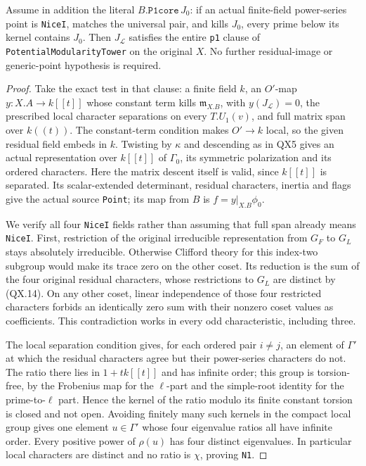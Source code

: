 \begin{proposition}
\label{claim:QX8}
Assume in addition the literal $B.\texttt{P1core}\,J_0$:
if an actual finite-field power-series point is
\texttt{NiceI}, matches the universal pair, and kills
$J_0$, every prime below its kernel contains $J_0$.
Then $J_{\mathcal L}$ satisfies the entire
\texttt{p1} clause of \texttt{PotentialModularityTower}
on the original $X$.  No further residual-image or
generic-point hypothesis is required.
\end{proposition}
\begin{proof}
Take the exact test in that clause: a finite field $k$,
an $O'$-map $y:X.A\to k[[t]]$ whose constant term kills
$\mathfrak m_{X.B}$, with $y(J_{\mathcal L})=0$,
the prescribed local character separations on every
$T.U_1(v)$, and full matrix span over $k((t))$.
The constant-term condition makes $O'\to k$ local,
so the given residual field embeds in $k$.
Twisting by $\kappa$ and descending as in QX5 gives
an actual representation over $k[[t]]$ of $\Gamma_0$,
its symmetric polarization and its ordered characters.
Here the matrix descent itself is valid, since
$k[[t]]$ is separated.  Its scalar-extended determinant,
residual characters, inertia and flags give the actual
source \texttt{Point}; its map from $B$ is
$f=y|_{X.B}\phi_0$.

We verify all four \texttt{NiceI} fields rather than
assuming that full span already means \texttt{NiceI}.
First, restriction of the original irreducible
representation from $G_F$ to $G_L$ stays absolutely
irreducible.  Otherwise Clifford theory for this
index-two subgroup would make its trace zero on the
other coset.  Its reduction is the sum of the four
original residual characters, whose restrictions to
$G_L$ are distinct by (QX.14).  On any other coset,
linear independence of those four restricted
characters forbids an identically zero sum with their
nonzero coset values as coefficients.  This contradiction
works in every odd characteristic, including three.

The local separation condition gives, for each ordered
pair $i\ne j$, an element of $\Gamma'$ at which the
residual characters agree but their power-series
characters do not.  The ratio there lies in
$1+tk[[t]]$ and has infinite order; this group is
torsion-free, by the Frobenius map for the $\ell$-part
and the simple-root identity for the prime-to-$\ell$
part.  Hence the kernel of the ratio modulo its finite
constant torsion is closed and not open.
Avoiding finitely many such kernels in the compact
local group gives one element $u\in\Gamma'$ whose
four eigenvalue ratios all have infinite order.
Every positive power of $\rho(u)$ has four distinct
eigenvalues.  In particular local characters are
distinct and no ratio is $\chi$, proving \texttt{N1}.


\end{proof}
